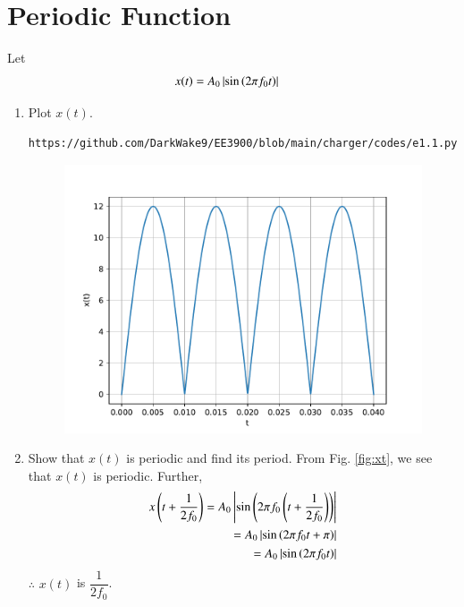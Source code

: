 \documentclass[journal,12pt,twocolumn]{IEEEtran}
\renewcommand\thesection{\arabic{section}}
\begin{document}
\section{Periodic Function}
Let 
\begin{align}
	x(t) &= A_0\left\vert\sin\left(2\pi f_0 t\right)\right\vert
	\label{eq:10-orig-diff-def}
\end{align}
\begin{enumerate}[label=\thesection.\arabic*
,ref=\thesection.\theenumi]
\item Plot $x(t)$.\\
\solution
\begin{lstlisting}
https://github.com/DarkWake9/EE3900/blob/main/charger/codes/e1.1.py
\end{lstlisting}
\begin{figure}[!ht]
	\begin{center}
		\includegraphics[width=\columnwidth]{./figs/e1.1.pdf}
	\end{center}
	\label{fig:xt}	
\end{figure}
\item Show that $x(t)$ is periodic and find its period.
\solution From Fig. \eqref{fig:xt}, we see that $x(t)$ is periodic. Further,
\begin{align}
	x\left(t+\frac{1}{2f_0}\right) = A_0\left\vert\sin\left(2\pi f_0\left(t + \frac{1}{2f_0}\right)\right)\right\vert \\
	= A_0\left\vert\sin\left(2\pi f_0t + \pi\right)\right\vert \\
	= A_0\left\vert\sin\left(2\pi f_0t\right)\right\vert
\end{align}
$\therefore$ $x(t)$ is $\dfrac{1}{2f_0}$.

\end{enumerate}
\end{document}
